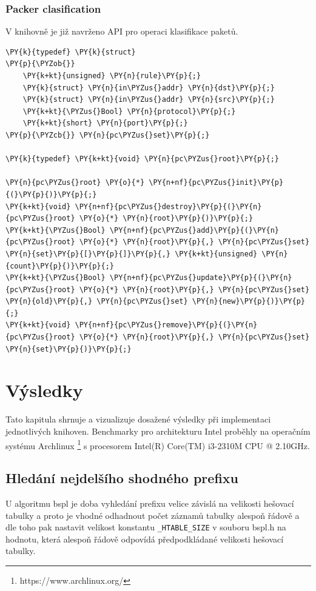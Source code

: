 \subsection{Packer clasification}
V knihovně je již navrženo API pro operaci klasifikace paketů.

\begin{Verbatim}[commandchars=\\\{\}]
\PY{k}{typedef} \PY{k}{struct}
\PY{p}{\PYZob{}}
	\PY{k+kt}{unsigned} \PY{n}{rule}\PY{p}{;}
	\PY{k}{struct} \PY{n}{in\PYZus{}addr} \PY{n}{dst}\PY{p}{;}
	\PY{k}{struct} \PY{n}{in\PYZus{}addr} \PY{n}{src}\PY{p}{;}
	\PY{k+kt}{\PYZus{}Bool} \PY{n}{protocol}\PY{p}{;}
	\PY{k+kt}{short} \PY{n}{port}\PY{p}{;}
\PY{p}{\PYZcb{}} \PY{n}{pc\PYZus{}set}\PY{p}{;}

\PY{k}{typedef} \PY{k+kt}{void} \PY{n}{pc\PYZus{}root}\PY{p}{;}

\PY{n}{pc\PYZus{}root} \PY{o}{*} \PY{n+nf}{pc\PYZus{}init}\PY{p}{(}\PY{p}{)}\PY{p}{;}
\PY{k+kt}{void} \PY{n+nf}{pc\PYZus{}destroy}\PY{p}{(}\PY{n}{pc\PYZus{}root} \PY{o}{*} \PY{n}{root}\PY{p}{)}\PY{p}{;}
\PY{k+kt}{\PYZus{}Bool} \PY{n+nf}{pc\PYZus{}add}\PY{p}{(}\PY{n}{pc\PYZus{}root} \PY{o}{*} \PY{n}{root}\PY{p}{,} \PY{n}{pc\PYZus{}set} \PY{n}{set}\PY{p}{[}\PY{p}{]}\PY{p}{,} \PY{k+kt}{unsigned} \PY{n}{count}\PY{p}{)}\PY{p}{;}
\PY{k+kt}{\PYZus{}Bool} \PY{n+nf}{pc\PYZus{}update}\PY{p}{(}\PY{n}{pc\PYZus{}root} \PY{o}{*} \PY{n}{root}\PY{p}{,} \PY{n}{pc\PYZus{}set} \PY{n}{old}\PY{p}{,} \PY{n}{pc\PYZus{}set} \PY{n}{new}\PY{p}{)}\PY{p}{;}
\PY{k+kt}{void} \PY{n+nf}{pc\PYZus{}remove}\PY{p}{(}\PY{n}{pc\PYZus{}root} \PY{o}{*} \PY{n}{root}\PY{p}{,} \PY{n}{pc\PYZus{}set} \PY{n}{set}\PY{p}{)}\PY{p}{;}
\end{Verbatim}



\chapter{Výsledky}\label{chapter:results}
Tato kapitula shrnuje a vizualizuje dosažené výsledky při implementaci jednotlivých knihoven.
Benchmarky pro architekturu Intel proběhly na operačním systému Archlinux \footnote{https://www.archlinux.org/} s procesorem Intel(R) Core(TM) i3-2310M CPU @ 2.10GHz.

\section{Hledání nejdelšího shodného prefixu}
U algoritmu bspl je doba vyhledání prefixu velice závislá na velikosti hešovací tabulky a proto je vhodné odhadnout počet záznamů tabulky alespoň řádově a dle toho pak nastavit velikost konstantu {\tt \_HTABLE\_SIZE} v souboru bspl.h na hodnotu, která alespoň řádově odpovídá předpodkládané velikosti hešovací tabulky.

